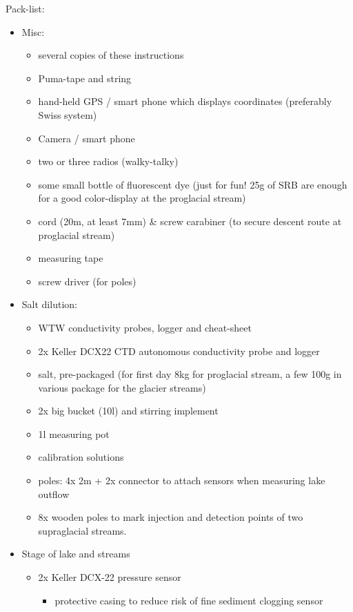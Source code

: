 \documentclass[DIV=15,halfparskip,11pt,headinclude]{scrartcl}
\begin{document}
Pack-list:\\
\begin{itemize}
\item Misc:
  \begin{itemize}
  \item several copies of these instructions
  \item Puma-tape and string
  \item hand-held GPS / smart phone which displays coordinates
    (preferably Swiss system)
  \item Camera / smart phone
  \item two or three radios (walky-talky)
  \item some small bottle of fluorescent dye (just for fun! 25g of SRB
    are enough for a good color-display at the proglacial stream)
  \item cord (20m, at least 7mm) \& screw carabiner (to secure descent route at
    proglacial stream)
  \item measuring tape
  \item screw driver (for poles)
  \end{itemize}
\item Salt dilution:
  \begin{itemize}
  \item WTW conductivity probes, logger and cheat-sheet
  \item 2x Keller DCX22 CTD autonomous conductivity probe and logger
  \item salt, pre-packaged (for first day 8kg for proglacial stream, a
    few 100g in various package for the glacier streams)
  \item 2x big bucket (10l) and stirring implement
  \item 1l measuring pot
  \item calibration solutions
  \item poles: 4x 2m + 2x connector to attach sensors when measuring
    lake outflow
  \item 8x wooden poles to mark injection and
    detection points of two supraglacial streams.
  \end{itemize}
\item Stage of lake and streams
  \begin{itemize}
  \item 2x Keller DCX-22 pressure sensor
  \begin{itemize}
    \item protective casing to
      reduce risk of fine sediment clogging sensor
    \end{itemize}

\end{itemize}
\end{itemize}
\end{document}
